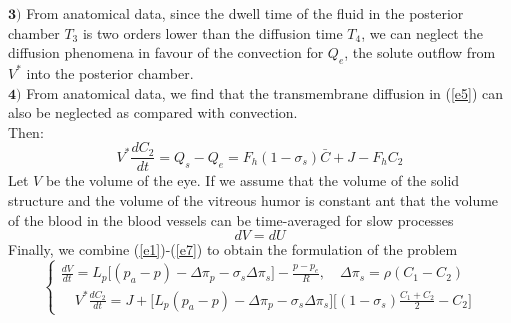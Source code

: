 \documentclass[english,12pt]{article}
\begin{document}
$\textbf{3)}$ From anatomical data, since the dwell time of the fluid in the posterior chamber $T_3$ is two orders lower than the diffusion time $T_4$, we can neglect the diffusion phenomena in favour of the convection for $Q_e$, the solute outflow from $V^{\ast}$ into the posterior chamber.\\
$\textbf{4)}$ From anatomical data, we find that the transmembrane diffusion in (\ref{e5}) can also be neglected as compared with convection.\\

Then:
\begin{equation}
V^{\ast} \frac{dC_{2}}{dt}= Q_s-Q_e=F_h (1-\sigma_s) \bar{C}+J-F_h C_2
\label{e6}
\end{equation}
Let $V$ be the volume of the eye. If we assume that the volume of the solid structure and the volume of the vitreous humor is constant ant that the volume of the blood in the blood vessels can be time-averaged for slow processes
\begin{equation}
dV = dU
\label{e7}
\end{equation}
Finally, we combine (\ref{e1})-(\ref{e7}) to obtain the formulation of the problem
\begin{equation}\label{e8}
\left\{\begin{array}{ll}
\displaystyle{\frac{dV}{dt}}= L_p \big[ (p_a-p)-\Delta\pi_{p}-\sigma_{s} \Delta\pi_{s}\big]-\frac{p-p_{e}}{R},\quad \Delta\pi_{s}=\rho(C_1-C_{2})\\
\quad V^{\ast} \displaystyle{\frac{dC_{2}}{dt}}=J+\big[ L_p (p_a-p)- \Delta\pi_{p}-\sigma_{s} \Delta\pi_{s}\big] \big[(1-\sigma_s)\displaystyle{\frac{C_1+C_2}{2}-C_2\big]}
\end{array}\right.
\end{equation}
\end{document}
